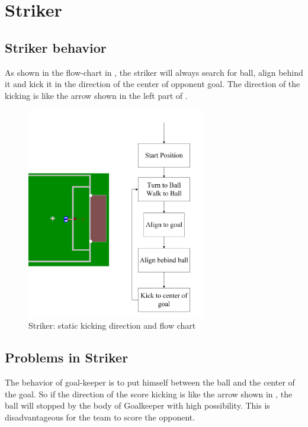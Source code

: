 \section{Striker}\label{sec:Striker}
\subsection{Striker behavior}
As shown in the flow-chart in , the striker will always  search for ball, align behind it and kick it in the direction of the center of opponent goal. The direction of the kicking is like the arrow shown in the left part of .
\begin{figure}[!htb]
  \centering
  \includegraphics[width=0.7\textwidth]{pics/St_Striker}
  \caption{Striker: static kicking direction and flow chart }
  \label{fig: StaStrik}
\end{figure}

\subsection{Problems in Striker}
The behavior of goal-keeper is to put himself between the ball and the center of the goal. So if the direction of the score kicking is like the arrow shown in , the ball will stopped by the body of Goalkeeper with high possibility. This is disadvantageous for the team to score the opponent.

